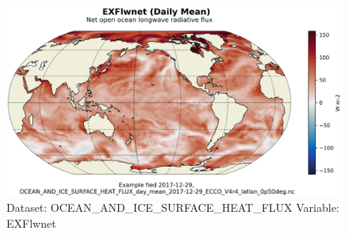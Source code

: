 \begin{figure}[H]
\centering
\includegraphics[scale=0.55]{../images/plots/latlon_plots/Ocean_and_Sea-Ice_Surface_Heat_Fluxes/EXFlwnet.png}
\caption{Dataset: OCEAN\_AND\_ICE\_SURFACE\_HEAT\_FLUX Variable: EXFlwnet}
\label{tab:table-OCEAN_AND_ICE_SURFACE_HEAT_FLUX_EXFlwnet-Plot}
\end{figure}
\pagebreak
